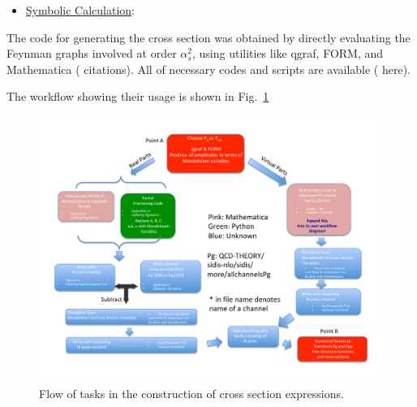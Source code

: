 \documentclass[12pt]{article}
\newcommand\3[1]{\boldsymbol{#1}}
\begin{document}

\begin{itemize}
\item \underline{Symbolic Calculation}:
\end{itemize}
The code for generating the cross section was obtained 
by directly evaluating the Feynman graphs involved at order $\alpha_s^2$, 
using utilities like qgraf, FORM, and Mathematica ({\color{red} citations}).
All of necessary codes and scripts are available ({\color{red} here}). 

The workflow showing their usage is shown in Fig.~\ref{workflow}
\begin{figure}[t]
\centering
    \includegraphics[scale=0.5]{workflow_master}
    \hspace{0.5cm}
\caption{Flow of tasks in the construction of cross section expressions.  
}
\label{workflow}
\end{figure}
\end{document}
